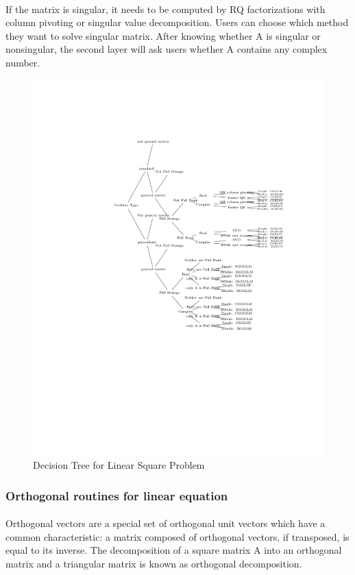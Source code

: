\documentclass[pdftex,12pt,a4paper]{article}
\begin{document}
\paragraph{}
If the matrix is singular, it needs to be computed by RQ factorizations with column pivoting or singular value decomposition.  Users can choose which method they want to solve singular matrix. After knowing whether A is singular or nonsingular, the second layer will ask users whether A contains any complex number. 
\graphicspath{ {/Users/lily/lighthouse-taxonomy/sandbox/lily} }
\begin{figure}
\includegraphics[scale=0.8]{vcl_decisionTree.pdf}
\caption{ Decision Tree for Linear Square Problem} 
\end{figure}
\subsubsection{Orthogonal routines for linear equation}

\paragraph{}
Orthogonal vectors are a special set of orthogonal unit vectors which have a common characteristic: a matrix composed of orthogonal vectors, if transposed, is equal to its inverse.  The decomposition of a square matrix A into an orthogonal matrix and a triangular matrix is known as orthogonal decomposition. 
\end{document}
